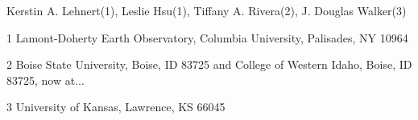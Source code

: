 Kerstin A. Lehnert(1), Leslie Hsu(1), Tiffany A. Rivera(2), J. Douglas Walker(3)

1 Lamont-Doherty Earth Observatory, Columbia University, Palisades, NY 10964

2 Boise State University, Boise, ID 83725 and College of Western Idaho, Boise, ID 83725, now at...

3 University of Kansas, Lawrence, KS 66045
